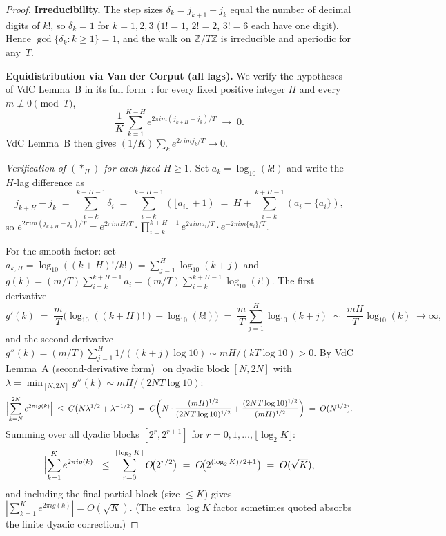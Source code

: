 \documentclass[
]{article}
\begin{document}
\begin{proof}
\textbf{Irreducibility.}
The step sizes $\delta_k = j_{k+1}-j_k$ equal the number of decimal
digits of $k!$, so $\delta_k = 1$ for $k = 1, 2, 3$
($1!=1$, $2!=2$, $3!=6$ each have one digit).
Hence $\gcd\{\delta_k : k\ge 1\}=1$, and the walk on $\mathbb{Z}/T\mathbb{Z}$
is irreducible and aperiodic for any~$T$.

\textbf{Equidistribution via Van der Corput (all lags).}
We verify the hypotheses of VdC Lemma~B in its full form~\cite{VdC31}:
for every fixed positive integer $H$ and every $m\not\equiv 0\pmod T$,
\[
  \frac{1}{K}\sum_{k=1}^{K-H} e^{2\pi im(j_{k+H}-j_k)/T}\;\longrightarrow\;0.\tag{$\ast_H$}
\]
VdC Lemma~B then gives $(1/K)\sum_k e^{2\pi imj_k/T}\to 0$.

\emph{Verification of $(\ast_H)$ for each fixed $H\ge 1$.}
Set $a_k = \log_{10}(k!)$ and write the $H$-lag difference as
\[
  j_{k+H}-j_k \;=\; \sum_{i=k}^{k+H-1}\delta_i
  \;=\; \sum_{i=k}^{k+H-1}(\lfloor a_i\rfloor+1)
  \;=\; H + \sum_{i=k}^{k+H-1}(a_i - \{a_i\}),
\]
so $e^{2\pi im(j_{k+H}-j_k)/T} = e^{2\pi imH/T}\cdot
\prod_{i=k}^{k+H-1}e^{2\pi ima_i/T}\cdot e^{-2\pi im\{a_i\}/T}$.

For the smooth factor: set $a_{k,H}=\log_{10}((k+H)!/k!)=\sum_{j=1}^H\log_{10}(k+j)$
and $g(k)= (m/T)\sum_{i=k}^{k+H-1}a_i = (m/T)\sum_{i=k}^{k+H-1}\log_{10}(i!)$.
The first derivative
\[
  g'(k)
  \;=\;\frac{m}{T}\bigl(\log_{10}((k+H)!)-\log_{10}(k!)\bigr)
  \;=\;\frac{m}{T}\sum_{j=1}^H\log_{10}(k+j)
  \;\sim\;\frac{mH}{T}\log_{10}(k)\;\to\infty,
\]
and the second derivative $g''(k)=(m/T)\sum_{j=1}^H 1/((k+j)\log 10)\sim mH/(kT\log 10)>0$.
By VdC Lemma~A (second-derivative form)~\cite{Weyl16,VdC31} on dyadic block
$[N,2N]$ with $\lambda=\min_{[N,2N]}g''(k)\sim mH/(2NT\log 10)$:
\[
  \Bigl|\sum_{k=N}^{2N} e^{2\pi ig(k)}\Bigr|
  \;\le\; C\bigl(N\lambda^{1/2}+\lambda^{-1/2}\bigr)
  \;=\; C\!\left(N\cdot\frac{(mH)^{1/2}}{(2NT\log 10)^{1/2}}
    +\frac{(2NT\log 10)^{1/2}}{(mH)^{1/2}}\right)
  \;=\; O(N^{1/2}).
\]
Summing over all dyadic blocks $[2^r, 2^{r+1}]$ for $r=0,1,\ldots,\lfloor\log_2 K\rfloor$:
\[
  \Bigl|\sum_{k=1}^K e^{2\pi ig(k)}\Bigr|
  \;\le\;\sum_{r=0}^{\lfloor\log_2 K\rfloor} O\!\bigl(2^{r/2}\bigr)
  \;=\; O\!\bigl(2^{(\log_2 K)/2+1}\bigr)
  \;=\; O(\sqrt{K}),
\]
and including the final partial block (size $\le K$) gives
$|\sum_{k=1}^K e^{2\pi ig(k)}| = O(\sqrt{K})$.
(The extra $\log K$ factor sometimes quoted absorbs the finite dyadic correction.)


\end{proof}
\end{document}
